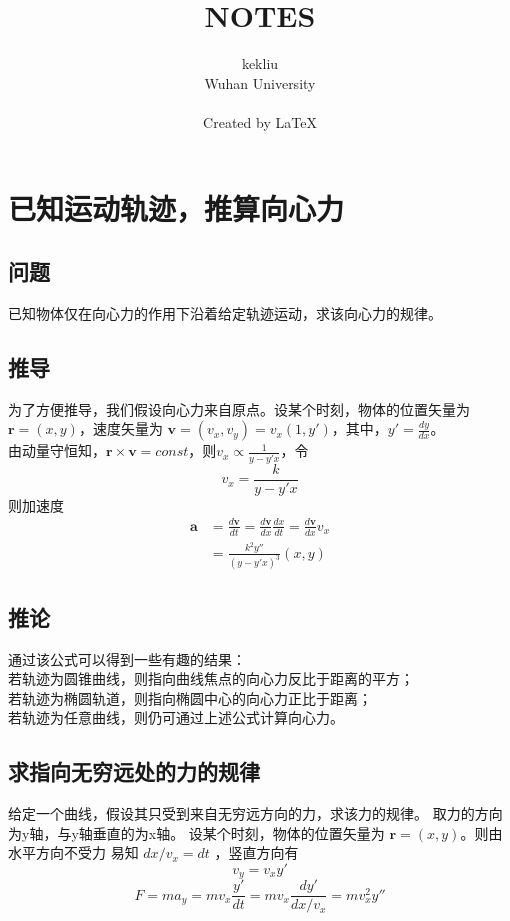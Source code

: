 \documentclass{ctexart}
\title{NOTES}
\author{kekliu\\Wuhan University\\\\Created by \LaTeX}
\renewcommand{\vec}[1]{\boldsymbol{#1}} %
\begin{document}
	
	\maketitle
	\thispagestyle{empty}
	\pagebreak
	
	\tableofcontents
	\thispagestyle{empty}
	\pagebreak
	
	\setcounter{page}{1}
	
	
	
	
	\section{已知运动轨迹，推算向心力}
	\subsection{问题}
	已知物体仅在向心力的作用下沿着给定轨迹运动，求该向心力的规律。
	\subsection{推导}
	为了方便推导，我们假设向心力来自原点。设某个时刻，物体的位置矢量为 $ \vec{r} =(x,y) $，速度矢量为 $ \vec{v}=(v_x,v_y)=v_x (1,y') $，其中，$ y'=\frac{dy}{dx} $。
	\\
	由动量守恒知，$ \vec{r}\times\vec{v}=const $，则$ v_x\propto\frac{1}{y-y'x} $，令
	\begin{equation} v_x=\frac{k}{y-y'x} \end{equation}
	则加速度
	\begin{equation}
	\begin{split}
	\vec{a} &= \frac{d\vec{v}}{dt} = \frac{d\vec{v}}{dx} \frac{dx}{dt} = \frac{d\vec{v}}{dx} v_x \\
	&= \frac{k^2 y''}{(y-y'x)^3} (x,y)
	\end{split}
	\end{equation}
	\subsection{推论}
	\noindent
	通过该公式可以得到一些有趣的结果：
	\\若轨迹为圆锥曲线，则指向曲线焦点的向心力反比于距离的平方；
	\\若轨迹为椭圆轨道，则指向椭圆中心的向心力正比于距离；
	\\若轨迹为任意曲线，则仍可通过上述公式计算向心力。
	\subsection{求指向无穷远处的力的规律}
	给定一个曲线，假设其只受到来自无穷远方向的力，求该力的规律。
	取力的方向为y轴，与y轴垂直的为x轴。
	设某个时刻，物体的位置矢量为 $ \vec{r} =(x,y) $。则由水平方向不受力
	易知 $dx / v_x = dt$ ，竖直方向有
	\begin{equation}
	v_y = v_x y'
	\end{equation}
	\begin{equation}
	F = m a_y = m v_x \frac{y'}{dt} = m v_x \frac{dy'}{dx / v_x} = m v_x^2 y''
	\end{equation}
\end{document}
